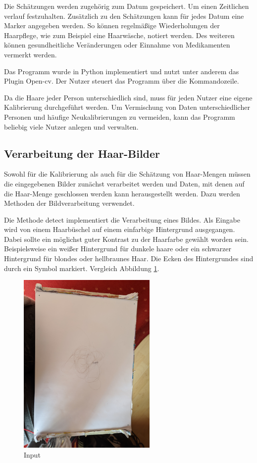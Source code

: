 \documentclass[german,a4paper, 12pt]{llncs}
\begin{document}
Die Schätzungen werden zugehörig zum Datum gespeichert. Um einen Zeitlichen verlauf festzuhalten.
Zusätzlich zu den Schätzungen kann für jedes Datum eine Marker angegeben werden. So können regelmäßige Wiederholungen der Haarpflege, wie zum Beispiel eine Haarwäsche, notiert werden. Des weiteren können gesundheitliche Veränderungen oder Einnahme von Medikamenten vermerkt werden.

Das Programm wurde in Python implementiert und nutzt unter anderem das Plugin Open-cv.
Der Nutzer steuert das Programm über die Kommandozeile. 

Da die Haare jeder Person unterschiedlich sind, muss für jeden Nutzer eine eigene Kalibrierung durchgeführt werden. Um Vermischung von Daten unterschiedlicher Personen und häufige Neukalibrierungen zu vermeiden, kann das Programm beliebig viele Nutzer anlegen und verwalten. 

\subsection{Verarbeitung der Haar-Bilder}

Sowohl für die Kalibrierung als auch für die Schätzung von Haar-Mengen müssen die eingegebenen Bilder zunächst verarbeitet werden und Daten, mit denen auf die Haar-Menge geschlossen werden kann herausgestellt werden. Dazu werden Methoden der Bildverarbeitung verwendet.

Die Methode detect implementiert die Verarbeitung eines Bildes.
Als Eingabe wird von einem Haarbüschel auf einem einfarbige Hintergrund ausgegangen. Dabei sollte ein möglichst guter Kontrast zu der Haarfarbe gewählt worden sein. Beispielsweise ein weißer Hintergrund für dunkele haare oder ein schwarzer Hintergrund für blondes oder hellbraunes Haar. Die Ecken des Hintergrundes sind durch ein Symbol markiert. Vergleich Abbildung \ref{img:input}.

\begin{figure}[H]
	\centering
	\includegraphics[width=0.6\textwidth]{fig64/00IMG_20200406_153354_12_g_15.jpg}
	\caption[]{Input}
	\label{img:input}
\end{figure}
\end{document}
